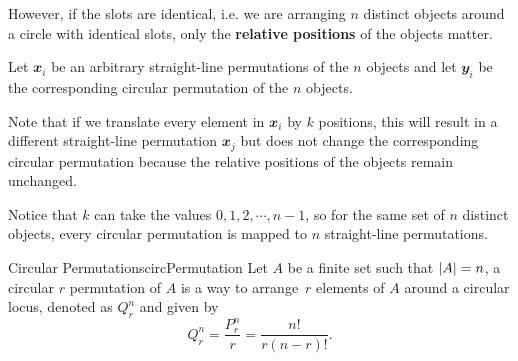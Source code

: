 \documentclass[math]{amznotes}
\theoremstyle{remark}
\newcommand{\0}{\mathbf{0}}
\newcommand{\1}{\mathbf{1}}
\begin{document}
However, if the slots are identical, i.e. we are arranging $n$ distinct objects around a circle with identical slots, only the \textbf{relative positions} of the objects matter.

Let $\mathbfit{x}_i$ be an arbitrary straight-line permutations of the $n$ objects and let $\mathbfit{y}_i$ be the corresponding circular permutation of the $n$ objects.

Note that if we translate every element in $\mathbfit{x}_i$ by $k$ positions, this will result in a different straight-line permutation $\mathbfit{x}_j$ but does not change the corresponding circular permutation because the relative positions of the objects remain unchanged.

Notice that $k$ can take the values $0, 1, 2, \cdots, n - 1$, so for the same set of $n$ distinct objects, every circular permutation is mapped to $n$ straight-line permutations.
\begin{dfnbox}{Circular Permutations}{circPermutation}
    Let $A$ be a finite set such that ${\left\lvert {A} \right\rvert} = n$, a circular $r$ permutation of $A$ is a way to arrange~$r$ elements of $A$ around a circular locus, denoted as $Q^n_r$ and given by
    \begin{equation*}
        Q^n_r = \frac{P^n_r}{r} = \frac{n!}{r(n - r)!}.
    \end{equation*}
\end{dfnbox}
\end{document}
